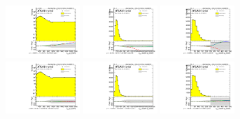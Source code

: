 \begin{figure}[htbp!]
\begin{center}
\includegraphics[width=0.25\textwidth,angle=-90]{figures/boosted/Reweight/Fits/Moriond_bkg_3_NoTag_3Trk_lead_Incl_sublHCand_Pt_m_1.pdf}
\includegraphics[width=0.25\textwidth,angle=-90]{figures/boosted/Reweight/Fits/Moriond_bkg_3_NoTag_3Trk_lead_Incl_sublHCand_trk0_Pt.pdf}
\includegraphics[width=0.25\textwidth,angle=-90]{figures/boosted/Reweight/Fits/Moriond_bkg_3_NoTag_3Trk_lead_Incl_sublHCand_trk1_Pt.pdf} \\
\includegraphics[width=0.25\textwidth,angle=-90]{figures/boosted/Reweight/Fits/Moriond_bkg_9_NoTag_3Trk_lead_Incl_sublHCand_Pt_m_1.pdf}
\includegraphics[width=0.25\textwidth,angle=-90]{figures/boosted/Reweight/Fits/Moriond_bkg_9_NoTag_3Trk_lead_Incl_sublHCand_trk0_Pt.pdf}
\includegraphics[width=0.25\textwidth,angle=-90]{figures/boosted/Reweight/Fits/Moriond_bkg_9_NoTag_3Trk_lead_Incl_sublHCand_trk1_Pt.pdf} \\

\end{center}
\end{figure}
